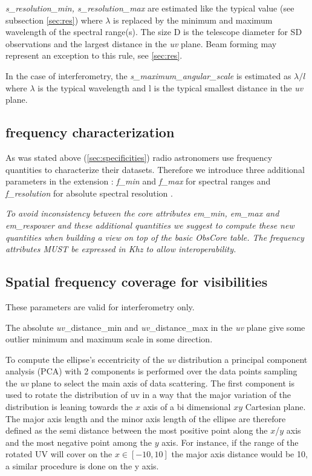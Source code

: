\documentclass[11pt,a4paper]{ivoa}
\begin{document}
\emph{s\_resolution\_min, s\_resolution\_max} are estimated like the typical value (see subsection \ref{sec:res}) where $\lambda$ is replaced by the minimum and maximum wavelength of the spectral range(s). The size D is the telescope diameter for SD observations and the largest distance in the \emph{uv} plane. Beam forming may represent an exception to this rule, see \ref{sec:res}.

In the case of interferometry, the \emph{s\_maximum\_angular\_scale} is estimated as $\lambda/l$ where $\lambda$ is the typical 
wavelength and l is the typical smallest distance in the \emph{uv} plane. 

\subsection{frequency characterization}

As was stated above (\ref{sec:specificities}) radio astronomers use frequency quantities to characterize their datasets. Therefore we introduce three additional parameters in the extension : \emph{f\_min} and \emph{f\_max} for spectral ranges and \emph{f\_resolution} for absolute spectral resolution .

\textit{To avoid inconsistency between the core attributes \emph{em\_min, em\_max} and \emph{em\_respower} and these additional quantities we suggest to compute these new quantities when building a view on top of the basic ObsCore table. The frequency attributes MUST be expressed in Khz to allow interoperability.} 

\subsection{Spatial frequency coverage for visibilities  }
These parameters are valid for interferometry only.

The absolute \emph{uv}\_distance\_min and \emph{uv}\_distance\_max  in the \emph{uv} plane give some outlier minimum and maximum scale in some direction.

To compute the ellipse's eccentricity of the \emph{uv} distribution a principal component analysis 
(PCA) with 2 components is performed over the data points sampling the \emph{uv} plane to select the 
main axis of data scattering. 
The first component is used to rotate the distribution of uv in a way that the major variation 
of the distribution is leaning towards the $x$ axis of a bi dimensional $xy$ Cartesian plane. 
The major axis length and the minor axis length of the ellipse are therefore defined as the 
semi distance between the most positive point along the $x$/$y$ axis and the most negative point 
among the $y$ axis. For instance, if the range of the rotated UV will cover on the $x \in [-10, 
10]$ the major axis distance would be 10, a similar procedure is done on the y axis. 
\end{document}
